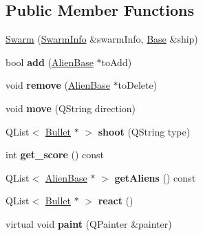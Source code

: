 \subsection*{Public Member Functions}
\begin{DoxyCompactItemize}
\item 
\hyperlink{classgame_1_1Swarm_abb77569228eb93b30ba187991a1c9a6b}{Swarm} (\hyperlink{classgame_1_1SwarmInfo}{Swarm\+Info} \&swarm\+Info, \hyperlink{classgame_1_1Base}{Base} \&ship)
\item 
\mbox{\label{classgame_1_1Swarm_a0d4f05f3b4bcdb9bfc339d5017cbb676}} 
bool {\bfseries add} (\hyperlink{classgame_1_1AlienBase}{Alien\+Base} $\ast$to\+Add)
\item 
\mbox{\label{classgame_1_1Swarm_a7fd2d1d831a3cee779085727b64b1a28}} 
void {\bfseries remove} (\hyperlink{classgame_1_1AlienBase}{Alien\+Base} $\ast$to\+Delete)
\item 
\mbox{\label{classgame_1_1Swarm_a658bc4cfff9d0b90b3d78a993122fec5}} 
void {\bfseries move} (Q\+String direction)
\item 
\mbox{\label{classgame_1_1Swarm_af4a57a9e2d29d9572a4eecedb8094e88}} 
Q\+List$<$ \hyperlink{classgame_1_1Bullet}{Bullet} $\ast$ $>$ {\bfseries shoot} (Q\+String type)
\item 
\mbox{\label{classgame_1_1Swarm_aec4ececc4e0c199ba9e669c20f06099a}} 
int {\bfseries get\+\_\+score} () const
\item 
\mbox{\label{classgame_1_1Swarm_a4118700e3f584dd12b1157b7706f174b}} 
Q\+List$<$ \hyperlink{classgame_1_1AlienBase}{Alien\+Base} $\ast$ $>$ {\bfseries get\+Aliens} () const
\item 
\mbox{\label{classgame_1_1Swarm_a997d0cc9a90667196d8b50ac065f2cf9}} 
Q\+List$<$ \hyperlink{classgame_1_1Bullet}{Bullet} $\ast$ $>$ {\bfseries react} ()
\item 
\mbox{\label{classgame_1_1Swarm_ab1b1374558520158868e505ec24547ba}} 
virtual void {\bfseries paint} (Q\+Painter \&painter)
\end{DoxyCompactItemize}
